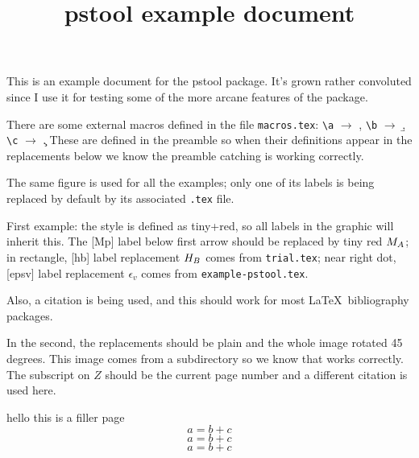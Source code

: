 \documentclass[12pt]{memoir}
\begin{document}

\title{\textsf{pstool} example document}
\maketitle

This is an example document for the \textsf{pstool} package. It's grown rather convoluted since I use it for testing some of the more arcane features of the package.

There are some external macros defined in the file \texttt{macros.tex}: \verb|\a| $\to$ \a, \verb|\b| $\to$ \b, \verb|\c| $\to$ \c. These are defined in the preamble so when their definitions appear in the replacements below we know the preamble catching is working correctly.

The same figure is used for all the examples; only one of its labels is being replaced by default by its associated \verb|.tex| file.

\newpage

First example: the style is defined as tiny+red, so all labels in the graphic will inherit this. The [Mp] label below first arrow should be replaced by tiny red $M_A$; in rectangle,  [hb] label replacement $H_B$ comes from \texttt{trial.tex}; near right dot, [epsv] label replacement $\epsilon_v$ comes from \texttt{example-pstool.tex}.

\begin{center}
\end{center}

Also, a citation is being used, and this should work for most \LaTeX\ bibliography packages.

\clearpage
In the second, the replacements should be plain and the whole image rotated 45 degrees.
This image comes from a subdirectory so we know that works correctly.
The subscript on $Z$ should be the current page number and a different citation is used here.

\begin{center}
\end{center}


\frontmatter
hello this is a filler page
\begin{equation}
a=b+c\label{eq1}
\end{equation}
\begin{equation}
a=b+c\label{eq2}
\end{equation}
\begin{equation}
a=b+c\label{eq3}
\end{equation}
\end{document}
